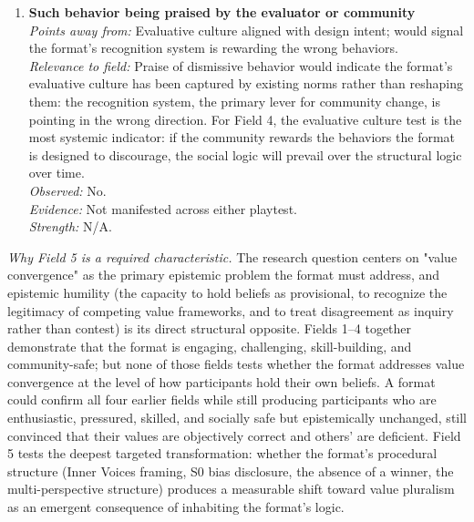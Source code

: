 \begin{enumerate}
\item \textbf{Such behavior being praised by the evaluator or community}\\
\textit{Points away from:} Evaluative culture aligned with design intent; would signal the format's recognition system is rewarding the wrong behaviors.\\
\textit{Relevance to field:} Praise of dismissive behavior would indicate the format's evaluative culture has been captured by existing norms rather than reshaping them: the recognition system, the primary lever for community change, is pointing in the wrong direction. For Field 4, the evaluative culture test is the most systemic indicator: if the community rewards the behaviors the format is designed to discourage, the social logic will prevail over the structural logic over time.\\
\textit{Observed:} No.\\
\textit{Evidence:} Not manifested across either playtest.\\
\textit{Strength:} N/A.

\end{enumerate}

\bigskip


\noindent\textit{Why Field 5 is a required characteristic.} The research question centers on "value convergence" as the primary epistemic problem the format must address, and epistemic humility (the capacity to hold beliefs as provisional, to recognize the legitimacy of competing value frameworks, and to treat disagreement as inquiry rather than contest) is its direct structural opposite. Fields 1--4 together demonstrate that the format is engaging, challenging, skill-building, and community-safe; but none of those fields tests whether the format addresses value convergence at the level of how participants hold their own beliefs. A format could confirm all four earlier fields while still producing participants who are enthusiastic, pressured, skilled, and socially safe but epistemically unchanged, still convinced that their values are objectively correct and others' are deficient. Field 5 tests the deepest targeted transformation: whether the format's procedural structure (Inner Voices framing, S0 bias disclosure, the absence of a winner, the multi-perspective structure) produces a measurable shift toward value pluralism as an emergent consequence of inhabiting the format's logic.

\bigskip

